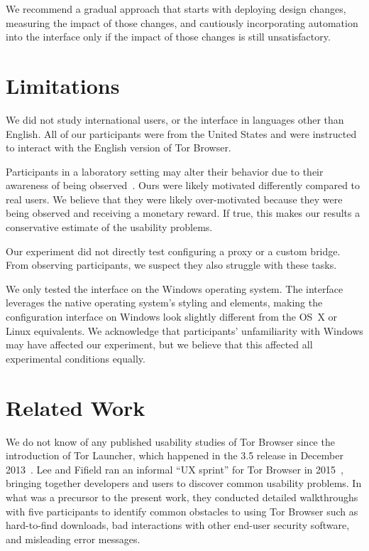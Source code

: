 \documentclass[USenglish,oneside,twocolumn]{article}
\begin{document}
We recommend a gradual approach that starts with deploying design changes, measuring the impact of those changes, and cautiously incorporating automation into the interface only if the impact of those changes is still unsatisfactory. 

\section{Limitations}
\label{sec:limitations}
We did not study international users, or the interface in languages other than English. All of our participants were from the United States and were instructed to interact with the English version of Tor Browser.

Participants in a laboratory setting may alter their behavior due to their awareness of being observed~\cite{mccarney2007hawthorne}. Ours were likely motivated differently compared to real users. We believe that they were likely over-motivated because they were being observed and receiving a monetary reward. If true, this makes our results a conservative estimate of the usability problems. 

Our experiment did not directly test configuring a proxy or a custom bridge. From observing participants, we suspect they also struggle with these tasks. 

We only tested the interface on the Windows operating system. The interface leverages the native operating system's styling and elements, making the configuration interface on Windows look slightly different from the OS~X or Linux equivalents. We acknowledge that participants' unfamiliarity with Windows may have affected our experiment, but we believe that this affected all experimental conditions equally.  

\section{Related Work}
\label{sec:related} 

We do not know of any published usability studies of Tor Browser
since the introduction of Tor Launcher,
which happened in the 3.5 release in December 2013~\cite{torbrowser-35}.
Lee and Fifield ran an informal ``UX sprint''
for Tor Browser in 2015~\cite{uxsprint}, bringing together developers and users
to discover common usability problems.
In what was a precursor to the present work,
they conducted detailed walkthroughs with five participants
to identify common obstacles to using Tor Browser such as hard-to-find downloads,
bad interactions with other end-user security software,
and misleading error messages.
\end{document}
